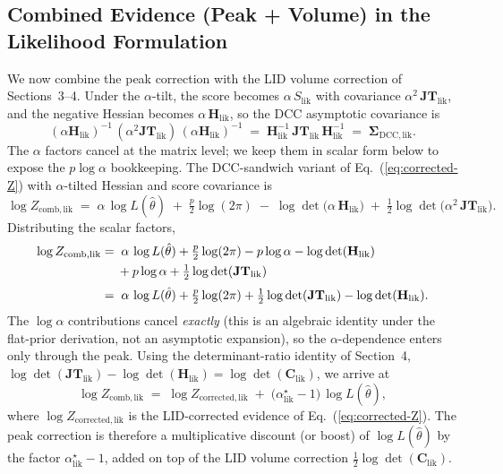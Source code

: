 \documentclass[11pt]{article}
\begin{document}
\subsection{Combined Evidence (Peak + Volume) in the Likelihood Formulation}
\label{sec:combined-evidence-lik}

We now combine the peak correction with the LID volume correction of Sections~3--4. Under the $\alpha$-tilt, the score becomes $\alpha\,S_{\mathrm{lik}}$ with covariance $\alpha^2\,\mathbf{JT}_{\mathrm{lik}}$, and the negative Hessian becomes $\alpha\,\mathbf H_{\mathrm{lik}}$, so the DCC asymptotic covariance is
\begin{equation}
(\alpha\mathbf H_{\mathrm{lik}})^{-1}\,(\alpha^2\mathbf{JT}_{\mathrm{lik}})\,(\alpha\mathbf H_{\mathrm{lik}})^{-1}
\;=\;
\mathbf H_{\mathrm{lik}}^{-1}\,\mathbf{JT}_{\mathrm{lik}}\,\mathbf H_{\mathrm{lik}}^{-1}
\;=\;
\boldsymbol\Sigma_{\mathrm{DCC},\mathrm{lik}}.
\label{eq:alpha-DCC-cov}
\end{equation}
The $\alpha$ factors cancel at the matrix level; we keep them in scalar form below to expose the $p\log\alpha$ bookkeeping. The DCC-sandwich variant of Eq.~(\ref{eq:corrected-Z}) with $\alpha$-tilted Hessian and score covariance is
\begin{equation}
\log Z_{\mathrm{comb},\mathrm{lik}}
\;=\;
\alpha\,\log L(\hat\theta)
\;+\;
\tfrac{p}{2}\log(2\pi)
\;-\;
\log\det\!\bigl(\alpha\,\mathbf H_{\mathrm{lik}}\bigr)
\;+\;
\tfrac{1}{2}\log\det\!\bigl(\alpha^2\,\mathbf{JT}_{\mathrm{lik}}\bigr).
\label{eq:Z-comb-lik-raw}
\end{equation}
Distributing the scalar factors,
\begin{align}
\log Z_{\mathrm{comb},\mathrm{lik}}
&=\;
\alpha\,\log L(\hat\theta)
+ \tfrac{p}{2}\log(2\pi)
- p\log\alpha
- \log\det(\mathbf H_{\mathrm{lik}})
\notag\\
&\quad\;
+ p\log\alpha
+ \tfrac{1}{2}\log\det(\mathbf{JT}_{\mathrm{lik}})
\\[2pt]
&=\;
\alpha\,\log L(\hat\theta)
+ \tfrac{p}{2}\log(2\pi)
+ \tfrac{1}{2}\log\det(\mathbf{JT}_{\mathrm{lik}})
- \log\det(\mathbf H_{\mathrm{lik}}).
\end{align}
The $\log\alpha$ contributions cancel \emph{exactly} (this is an algebraic identity under the flat-prior derivation, not an asymptotic expansion), so the $\alpha$-dependence enters only through the peak. Using the determinant-ratio identity of Section~4, $\log\det(\mathbf{JT}_{\mathrm{lik}}) - \log\det(\mathbf H_{\mathrm{lik}}) = \log\det(\mathbf C_{\mathrm{lik}})$, we arrive at
\begin{equation}
\boxed{\;
\log Z_{\mathrm{comb},\mathrm{lik}}
\;=\;
\log Z_{\mathrm{corrected},\mathrm{lik}}
\;+\;
\bigl(\alpha^\star_{\mathrm{lik}} - 1\bigr)\,\log L(\hat\theta),
\;}
\label{eq:Z-comb-lik-final}
\end{equation}
where $\log Z_{\mathrm{corrected},\mathrm{lik}}$ is the LID-corrected evidence of Eq.~(\ref{eq:corrected-Z}). The peak correction is therefore a multiplicative discount (or boost) of $\log L(\hat\theta)$ by the factor $\alpha^\star_{\mathrm{lik}} - 1$, added on top of the LID volume correction $\tfrac{1}{2}\log\det(\mathbf C_{\mathrm{lik}})$.
\end{document}
